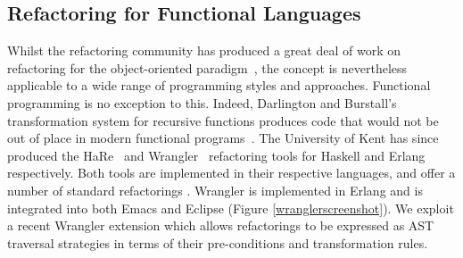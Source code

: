 \documentclass[final]{jfp1}
\begin{document}


\subsection{Refactoring for Functional Languages}

Whilst the refactoring community has produced a great deal of work on
refactoring for the object-oriented paradigm~\cite{Dig}, the concept is
nevertheless applicable to a wide range of programming styles and
approaches. Functional programming is no exception to this. Indeed, Darlington
and Burstall's transformation system for recursive functions produces code that
would not be out of place in modern functional programs~\cite{darlington77}. The
University of Kent has since produced the HaRe~\cite{hare} and
Wrangler~\cite{wrangler} refactoring tools for Haskell and Erlang
respectively. Both tools are implemented in their respective languages, and
offer a number of standard refactorings . Wrangler is
implemented in Erlang and is integrated into both Emacs and Eclipse (Figure
\ref{wranglerscreenshot}). We exploit a recent Wrangler extension which
allows refactorings to be expressed as AST traversal strategies in terms of
their pre-conditions and transformation rules.  %
\end{document}
